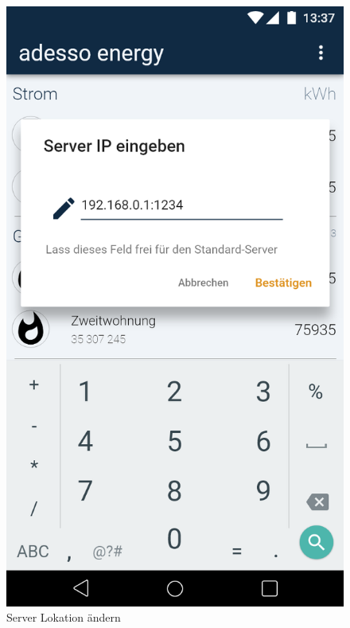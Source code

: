 \begin{figure}[h]
	\includegraphics[scale = 0.22]{img/AndroidMockup/serverLocation}		
	\caption{Server Lokation ändern}
	\label{fig:mock-pw}
\end{figure}

